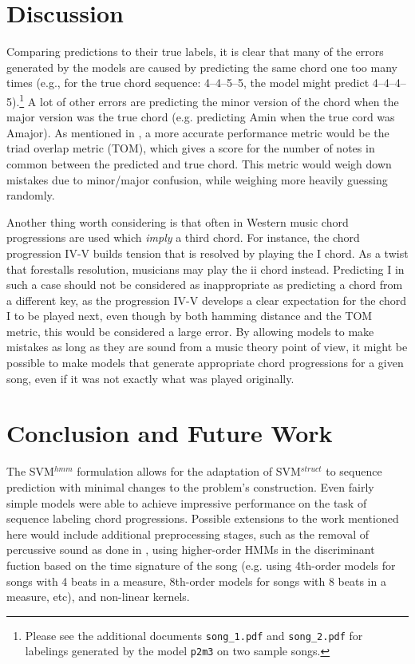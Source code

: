 \section{Discussion}

Comparing predictions to their true labels, it is clear that many of the errors
generated by the models are caused by predicting the same chord one too many
times (e.g., for the true chord sequence: 4--4--5--5, the model might predict
4--4--4--5).\footnote{Please see the additional documents \texttt{song\_1.pdf}
and \texttt{song\_2.pdf} for labelings generated by the model \texttt{p2m3} on
two sample songs.} A lot of other errors are predicting the minor version of
the chord when the major version was the true chord (e.g.  predicting Amin when
the true cord was Amajor). As mentioned in \cite{Weller_structuredprediction},
a more accurate performance metric would be the triad overlap metric (TOM),
which gives a score for the number of notes in common between the predicted and
true chord. This metric would weigh down mistakes due to minor/major confusion,
while weighing more heavily guessing randomly.

Another thing worth considering is that often in Western music chord
progressions are used which \emph{imply} a third chord. For instance, the chord
progression IV-V builds tension that is resolved by playing the I chord.  As a
twist that forestalls resolution, musicians may play the ii chord instead.
Predicting I in such a case should not be considered as inappropriate as
predicting a chord from a different key, as the progression IV-V develops a
clear expectation for the chord I to be played next, even though by both
hamming distance and the TOM metric, this would be considered a large error. By
allowing models to make mistakes as long as they are sound from a music theory
point of view, it might be possible to make models that generate appropriate
chord progressions for a given song, even if it was not exactly what was played
originally.

\section{Conclusion and Future Work}

The SVM$^{hmm}$ formulation allows for the adaptation of SVM$^{struct}$ to
sequence prediction with minimal changes to the problem's construction. Even
fairly simple models were able to achieve impressive performance on the task of
sequence labeling chord progressions. Possible extensions to the work mentioned
here would include additional preprocessing stages, such as the removal of
percussive sound as done in \cite{Ono_separation}, using higher-order HMMs in
the discriminant fuction based on the time signature of the song (e.g.
using 4th-order models for songs with 4 beats in a measure, 8th-order models
for songs with 8 beats in a measure, etc), and non-linear kernels.


\clearpage
\begin{small}


\end{small}



